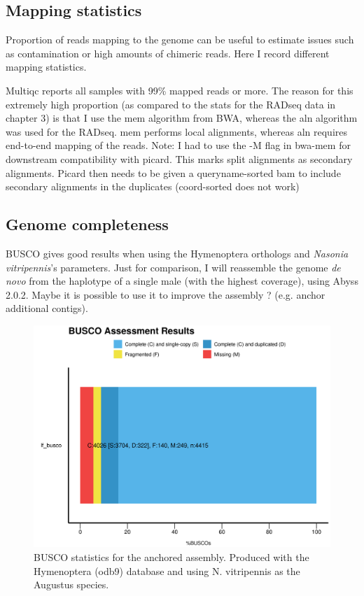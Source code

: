 \documentclass[10pt,a4paper]{report}
\begin{document}
\subsection{Mapping statistics}
Proportion of reads mapping to the genome can be useful to estimate issues such as contamination or high amounts of chimeric reads. Here I record different mapping statistics.

Multiqc reports all samples with 99\% mapped reads or more. The reason for this extremely high proportion (as compared to the stats for the RADseq data in chapter 3) is that I use the mem algorithm from BWA, whereas the aln algorithm was used for the RADseq. mem performs local alignments, whereas aln requires end-to-end mapping of the reads.
Note: I had to use the -M flag in bwa-mem for downstream compatibility with picard. This marks split alignments as secondary alignments. Picard then needs to be given a queryname-sorted bam to include secondary alignments in the duplicates (coord-sorted does not work)

\subsection{Genome completeness}
BUSCO gives good results when using the Hymenoptera orthologs and \textit{Nasonia vitripennis}'s parameters. Just for comparison, I will reassemble the genome \textit{de novo} from the haplotype of a single male (with the highest coverage), using Abyss 2.0.2. Maybe it is possible to use it to improve the assembly ? (e.g. anchor additional contigs).

\begin{figure}
\includegraphics[width=\textwidth]{nucleo_div_wgs/qc/busco_figure.png}
\caption{BUSCO statistics for the anchored assembly. Produced with the Hymenoptera (odb9) database and using N. vitripennis as the Augustus species.}
\label{PCR_dup}
\end{figure}
\end{document}
